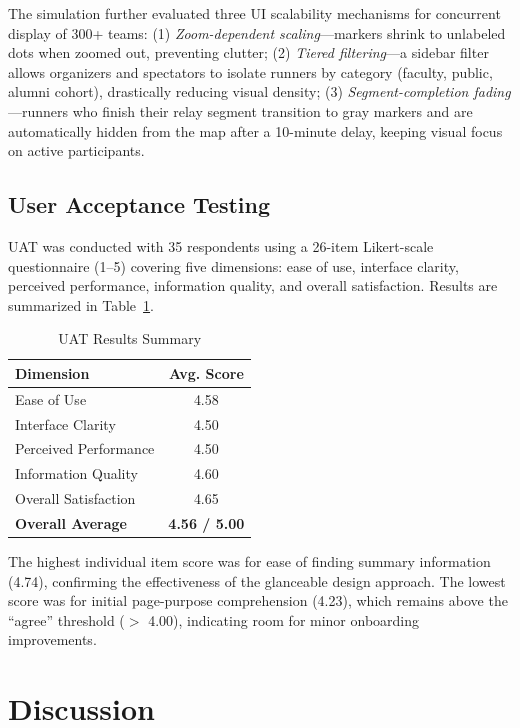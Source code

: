 \documentclass[conference]{IEEEtran}
\begin{document}
The simulation further evaluated three UI scalability mechanisms for concurrent display of 300+ teams: (1) \textit{Zoom-dependent scaling}---markers shrink to unlabeled dots when zoomed out, preventing clutter; (2) \textit{Tiered filtering}---a sidebar filter allows organizers and spectators to isolate runners by category (faculty, public, alumni cohort), drastically reducing visual density; (3) \textit{Segment-completion fading}---runners who finish their relay segment transition to gray markers and are automatically hidden from the map after a 10-minute delay, keeping visual focus on active participants.

\subsection{User Acceptance Testing}
UAT was conducted with 35 respondents using a 26-item Likert-scale questionnaire (1--5) covering five dimensions: ease of use, interface clarity, perceived performance, information quality, and overall satisfaction. Results are summarized in Table~\ref{tab:uat-results}.

\begin{table}[htbp]
\centering
\caption{UAT Results Summary}
\label{tab:uat-results}
\begin{tabular}{lc}
\toprule
\textbf{Dimension} & \textbf{Avg. Score} \\
\midrule
Ease of Use               & 4.58 \\
Interface Clarity         & 4.50 \\
Perceived Performance     & 4.50 \\
Information Quality       & 4.60 \\
Overall Satisfaction      & 4.65 \\
\midrule
\textbf{Overall Average}  & \textbf{4.56 / 5.00} \\
\bottomrule
\end{tabular}
\end{table}

The highest individual item score was for ease of finding summary information (4.74), confirming the effectiveness of the glanceable design approach. The lowest score was for initial page-purpose comprehension (4.23), which remains above the ``agree'' threshold ($>$ 4.00), indicating room for minor onboarding improvements.

\section{Discussion}
\end{document}
